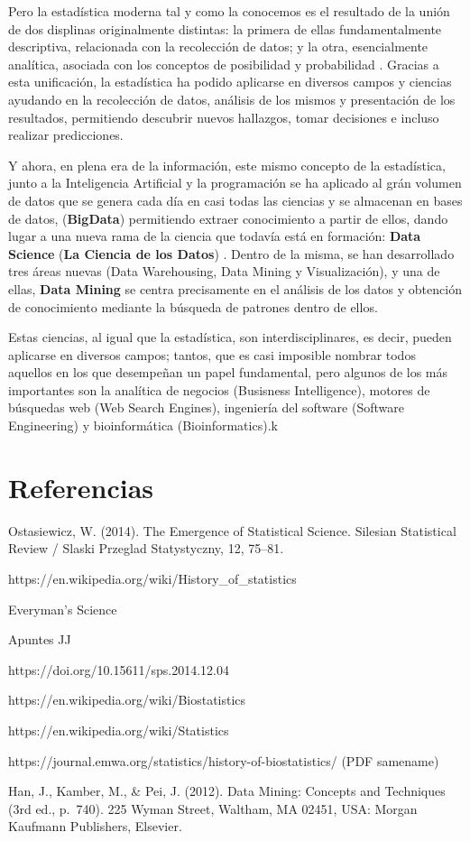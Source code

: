 \documentclass[3p,twocolumn]{elsarticle}
\begin{document}
Pero la estadística moderna tal y como la conocemos es el resultado de la unión de dos displinas originalmente distintas: la primera de ellas fundamentalmente descriptiva, relacionada con la recolección de datos; y la otra, esencialmente analítica, asociada con los conceptos de posibilidad y probabilidad \cite{cita3}. Gracias a esta unificación, la estadística ha podido aplicarse en diversos campos y ciencias ayudando en la recolección de datos, análisis de los mismos y presentación de los resultados, permitiendo descubrir nuevos hallazgos, tomar decisiones e incluso realizar predicciones.

Y ahora,  en plena era de la información, este mismo concepto de la estadística, junto a la Inteligencia Artificial y la programación se ha aplicado al grán volumen de datos que se genera cada día en casi todas las ciencias y se almacenan en bases de datos, (\textbf{BigData}) permitiendo extraer conocimiento a partir de ellos, dando lugar a una nueva rama de la ciencia que todavía está en formación: \textbf{Data Science} (\textbf{La Ciencia de los Datos}) \cite{cita4}. Dentro de la misma, se han desarrollado tres áreas nuevas (Data Warehousing, Data Mining y Visualización), y una de ellas, \textbf{Data Mining} se centra precisamente en el análisis de los datos y obtención de conocimiento mediante la búsqueda de patrones dentro de ellos.
 
Estas ciencias, al igual que la estadística, son interdisciplinares, es decir, pueden aplicarse en diversos campos; tantos, que es casi imposible nombrar todos aquellos en los que desempeñan un papel fundamental, pero algunos de los más importantes son la analítica de negocios (Busisness Intelligence), motores de búsquedas web (Web Search Engines), ingeniería del software (Software Engineering) y bioinformática (Bioinformatics).k


\newpage

\section{Referencias}
\begin{thebibliography}{X}

 Ostasiewicz, W. (2014). The Emergence of Statistical Science.
Silesian Statistical Review / Slaski Przeglad Statystyczny, 12, 75--81.

 https://en.wikipedia.org/wiki/History\_of\_statistics

 Everyman's Science

 Apuntes JJ

https://doi.org/10.15611/sps.2014.12.04

https://en.wikipedia.org/wiki/Biostatistics

https://en.wikipedia.org/wiki/Statistics

https://journal.emwa.org/statistics/history-of-biostatistics/ (PDF samename)

Han, J., Kamber, M., \& Pei, J. (2012). Data Mining: Concepts and
Techniques (3rd ed., p.~740). 225 Wyman Street, Waltham, MA 02451, USA:
Morgan Kaufmann Publishers, Elsevier.

\end{thebibliography}
\end{document}
